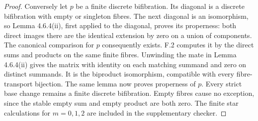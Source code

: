 \begin{proof}
Conversely let $p$ be a finite discrete bifibration. Its diagonal is a discrete bifibration with empty or singleton fibres. The next diagonal is an isomorphism, so Lemma 4.6.4(ii), first applied to the diagonal, proves its properness: both direct images there are the identical extension by zero on a union of components. The canonical comparison for $p$ consequently exists. F.2 computes it by the direct sums and products on the same finite fibres. Unwinding the mate in Lemma 4.6.4(ii) gives the matrix with identity on each matching summand and zero on distinct summands. It is the biproduct isomorphism, compatible with every fibre-transport bijection. The same lemma now proves properness of $p$. Every strict base change remains a finite discrete bifibration. Empty fibres cause no exception, since the stable empty sum and empty product are both zero. The finite star calculations for $m=0,1,2$ are included in the supplementary checker.
\end{proof}
